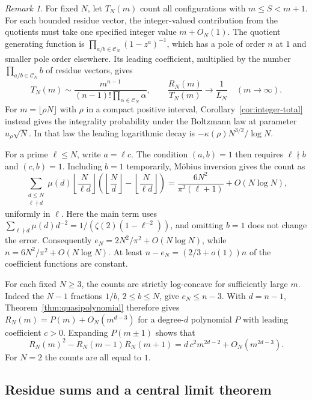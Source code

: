 \documentclass[11pt]{amsart}
\theoremstyle{remark}
\newtheorem{remark}[theorem]{Remark}
\newcommand{\CN}{\mathcal C_N}
\begin{document}
\begin{remark}\label{rem:fixed-comparison}
For fixed \(N\), let \(T_N(m)\) count all configurations with \(m\le S<m+1\). For each bounded residue vector, the integer-valued contribution from the quotients must take one specified integer value \(m+O_N(1)\). The quotient generating function is \(\prod_{a/b\in\CN}(1-z^a)^{-1}\), which has a pole of order \(n\) at \(1\) and smaller pole order elsewhere. Its leading coefficient, multiplied by the number \(\prod_{a/b\in\CN}b\) of residue vectors, gives
\[
 T_N(m)\sim\frac{m^{n-1}}{(n-1)!\prod_{\alpha\in\CN}\alpha},
 \qquad \frac{R_N(m)}{T_N(m)}\longrightarrow\frac1{L_N}
 \quad(m\to\infty).
\]
For \(m=\lfloor\rho N\rfloor\) with \(\rho\) in a compact positive interval, Corollary~\ref{cor:integer-total} instead gives the integrality probability under the Boltzmann law at parameter \(u_\rho\sqrt N\). In that law the leading logarithmic decay is \(-\kappa(\rho)N^{3/2}/\log N\).

For a prime \(\ell\le N\), write \(a=\ell c\). The condition \((a,b)=1\) then requires \(\ell\nmid b\) and \((c,b)=1\). Including \(b=1\) temporarily, M\"obius inversion gives the count as
\[
 \sum_{\substack{d\le N\\\ell\nmid d}}\mu(d)
 \left\lfloor\frac{N}{\ell d}\right\rfloor
 \left(\left\lfloor\frac Nd\right\rfloor-
       \left\lfloor\frac{N}{\ell d}\right\rfloor\right)
 =\frac{6N^2}{\pi^2(\ell+1)}+O(N\log N),
\]
uniformly in \(\ell\). Here the main term uses
\(\sum_{\ell\nmid d}\mu(d)d^{-2}=1/(\zeta(2)(1-\ell^{-2}))\), and omitting \(b=1\) does not change the error. Consequently \(e_N=2N^2/\pi^2+O(N\log N)\), while \(n=6N^2/\pi^2+O(N\log N)\). At least \(n-e_N=(2/3+o(1))n\) of the coefficient functions are constant.

For each fixed \(N\ge3\), the counts are strictly log-concave for
sufficiently large \(m\). Indeed the \(N-1\) fractions \(1/b\), \(2\le b\le N\),
give \(e_N\le n-3\). With \(d=n-1\), Theorem~\ref{thm:quasipolynomial}
therefore gives \(R_N(m)=P(m)+O_N(m^{d-3})\) for a degree-\(d\)
polynomial \(P\) with leading coefficient \(c>0\). Expanding \(P(m\pm1)\)
shows that
\[
 R_N(m)^2-R_N(m-1)R_N(m+1)
    =d\,c^2m^{2d-2}+O_N(m^{2d-3}).
\]
For \(N=2\) the counts are all equal to \(1\).
\end{remark}

\subsection{Residue sums and a central limit theorem}
\end{document}
